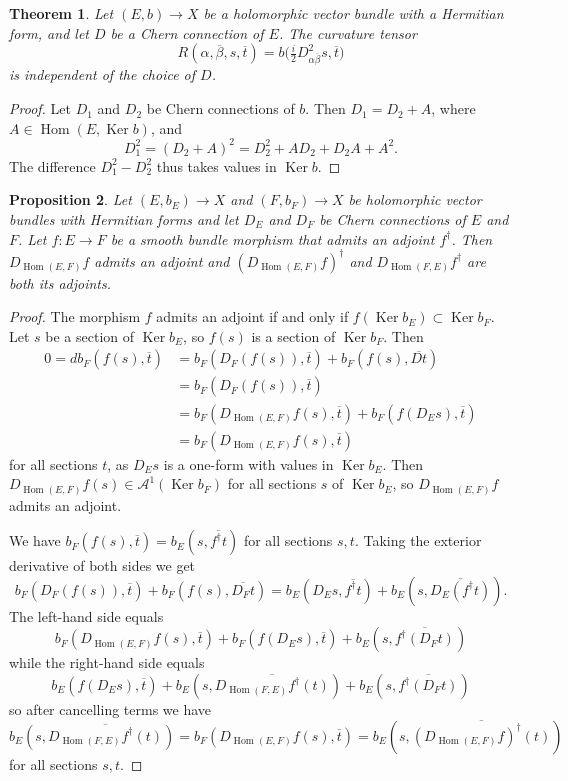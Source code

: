 \documentclass[10pt,a4paper]{amsart}
\newtheorem{theo}{Theorem}[section]
\newtheorem{prop}[theo]{Proposition}
\theoremstyle{definition}
\newcommand{\cc}[1]{\mathcal{#1}}
\def\ov#1{\overline{#1}}
\DeclareMathOperator{\Ker}{Ker}
\DeclareMathOperator{\Hom}{Hom}
\begin{document}
\begin{theo}
Let $(E, b) \to X$ be a holomorphic vector bundle with a Hermitian form, and let $D$ be a Chern connection of $E$. The curvature tensor
\[
R(\alpha,\ov\beta,s, \ov t)
= b\bigl(\tfrac i2 D^2_{\alpha\ov\beta}s, \ov t\bigr)
\]
is independent of the choice of $D$.
\end{theo}

\begin{proof}
Let $D_1$ and $D_2$ be Chern connections of $b$. Then $D_1 = D_2 + A$, where $A \in \Hom(E, \Ker b)$, and
\[
D_1^2
= (D_2 + A)^2
= D_2^2 + A D_2 + D_2 A + A^2.
\]
The difference $D_1^2 - D_2^2$ thus takes values in $\Ker b$.
\end{proof}




\begin{prop}
Let $(E,b_E) \to X$ and $(F,b_F) \to X$ be holomorphic vector bundles with Hermitian forms and let $D_E$ and $D_F$ be Chern connections of $E$ and $F$. Let $f : E \to F$ be a smooth bundle morphism that admits an adjoint $f^\dagger$. Then $D_{\Hom(E,F)}f$ admits an adjoint and $(D_{\Hom(E,F)}f)^\dagger$ and $D_{\Hom(F,E)}f^\dagger$ are both its adjoints.
\end{prop}


\begin{proof}
The morphism $f$ admits an adjoint if and only if $f(\Ker b_E) \subset \Ker b_F$. Let $s$ be a section of $\Ker b_E$, so $f(s)$ is a section of $\Ker b_F$. Then
\begin{align*}
0 = d b_F(f(s), \ov t)
&= b_F(D_F(f(s)), \ov t) + b_F(f(s), \ov{Dt})
\\
&= b_F(D_F(f(s)), \ov t)
\\
&= b_F(D_{\Hom(E,F)}f(s), \ov t) + b_F(f(D_Es), \ov t)
\\
&= b_F(D_{\Hom(E,F)}f(s), \ov t)
\end{align*}
for all sections $t$, as $D_Es$ is a one-form with values in $\Ker b_E$. Then $D_{\Hom(E,F)} f(s) \in \cc A^1(\Ker b_F)$ for all sections $s$ of $\Ker b_E$, so $D_{\Hom(E,F)}f$ admits an adjoint.

We have $b_F(f(s), \ov{t}) = b_E(s, \ov{f^\dagger t})$ for all sections $s,t$. Taking the exterior derivative of both sides we get
\[
b_F(D_F(f(s)), \ov t) + b_F(f(s), \ov{D_F t})
= b_E(D_E s, \ov {f^\dagger t}) + b_E(s, \ov{D_E(f^\dagger t)}).
\]
The left-hand side equals
\[
b_F(D_{\Hom(E,F)}f(s), \ov t)
+ b_F(f(D_Es), \ov t)
+ b_E(s, \ov{f^\dagger(D_F t)})
\]
while the right-hand side equals
\[
b_E(f(D_E s), \ov t)
+ b_E(s, \ov{D_{\Hom(F,E)}f^\dagger(t)})
+ b_E(s, \ov{f^\dagger(D_F t)})
\]
so after cancelling terms we have
\[
b_E(s, \ov{D_{\Hom(F,E)}f^\dagger(t)})
= b_F(D_{\Hom(E,F)}f(s), \ov t)
= b_E(s, \ov{(D_{\Hom(E,F)}f)^\dagger(t)})
\]
for all sections $s,t$.
\end{proof}
\end{document}
